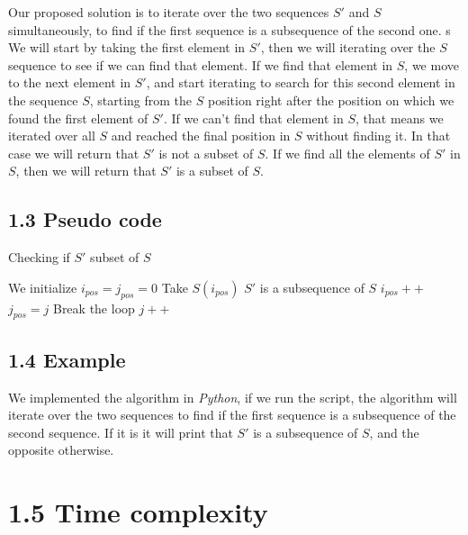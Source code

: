 \documentclass{article}
\begin{document}
Our proposed solution is to iterate over the two sequences $S'$ and $S$ simultaneously, to find if the first sequence is a subsequence of the second one.
s
We will start by taking the first element in $S'$, then we will iterating over the $S$ sequence to see if we can find that element. If we find that element in $S$, we move to the next element in $S'$, and start iterating to search for this second element in the sequence $S$, starting from the $S$ position right after the position on which we found the first element of $S'$. If we can't find that element in $S$, that means we iterated over all $S$ and reached the final position in $S$ without finding it. In that case we will return that $S'$ is not a subset of $S$. If we find all the elements of $S'$ in $S$, then we will return that $S'$ is a subset of $S$.

\subsection*{1.3 Pseudo code}

\begin{algorithm}[H]
\caption{Checking if $S'$ subset of $S$}
\begin{algorithmic}[1]
\State We initialize $i_{pos} = j_{pos} = 0$
 \State Take $S(i_{pos})$
    \State $S'$ is a subsequence of $S$
   \EndIf
    \State $i_{pos}++$
    \State $j_{pos} = j$
    \State Break the loop
   \EndIf
  \EndIf
   \State $j++$
  \EndIf
 \EndFor
\EndWhile
\end{algorithmic}
\end{algorithm}

\subsection*{1.4 Example}

We implemented the algorithm in \textit{Python}, if we run the script, the algorithm will iterate over the two sequences to find if the first sequence is a subsequence of the second sequence. If it is it will print that $S'$ is a subsequence of $S$, and the opposite otherwise.



\section*{1.5 Time complexity}
\end{document}

